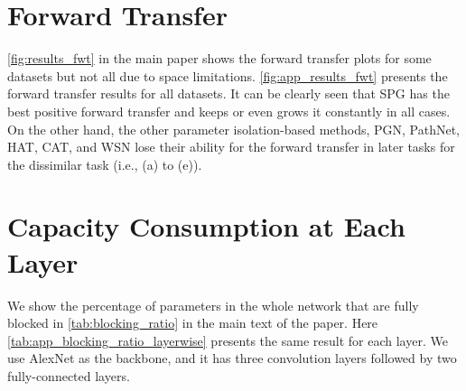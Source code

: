 \label{sec:appendix}

\section{Forward Transfer} \label{sec:app_results_fwt}


\cref{fig:results_fwt} in the main paper shows the forward transfer plots for some datasets but not all due to space limitations. \cref{fig:app_results_fwt} presents the forward transfer results for all datasets. 
It can be clearly seen that SPG has the best positive forward transfer and keeps or even grows it constantly in all cases. On the other hand, the other parameter isolation-based methods, PGN, PathNet, HAT, CAT, and WSN lose their ability for the forward transfer in later tasks for the dissimilar task (i.e., (a) to (e)).











\section{Capacity Consumption at Each Layer} \label{sec:app_capacity_layerwise}

We show the percentage of parameters in the whole network that are fully blocked in \cref{tab:blocking_ratio} in the main text of the paper. Here \cref{tab:app_blocking_ratio_layerwise} presents the same result for each layer. We use AlexNet as the backbone, and it has three convolution layers followed by two fully-connected layers.



